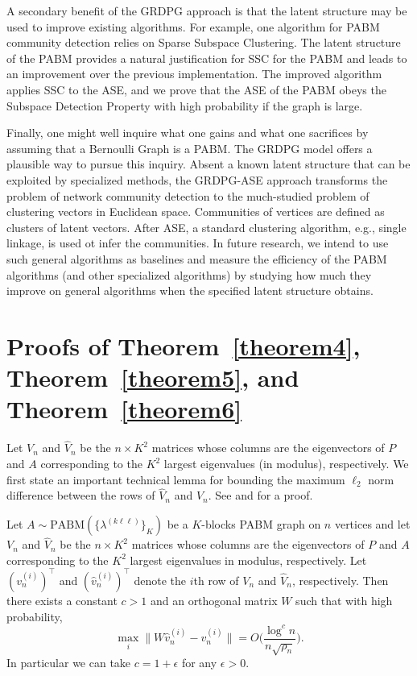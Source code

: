 \documentclass[12pt]{article}
\begin{document}
A secondary benefit of the GRDPG approach is that the latent structure
may be used to improve existing algorithms.  For example, one
algorithm for PABM community detection \citep{noroozi2019estimation}
relies on Sparse Subspace Clustering.  The latent structure of the
PABM provides a natural justification for SSC for the PABM and leads
to an improvement over the previous implementation.  The improved
algorithm applies SSC to the ASE, and we prove that the ASE of the
PABM obeys the Subspace Detection Property with high probability if
the graph is large.

Finally, one might well inquire what one gains and what one sacrifices
by assuming that a Bernoulli Graph is a PABM.  The GRDPG model offers
a plausible way to pursue this inquiry.  Absent a known latent
structure that can be exploited by specialized methods, the GRDPG-ASE
approach transforms the problem of network community detection to the
much-studied problem of clustering vectors in Euclidean space.
Communities of vertices are defined as clusters of latent vectors.
After ASE, a standard clustering algorithm, e.g., single linkage, is
used ot infer the communities.  In future research, we intend to use
such general algorithms as baselines and measure the efficiency of the
PABM algorithms (and other specialized algorithms) by studying how
much they improve on general algorithms when the specified latent
structure obtains.

\appendix
\renewcommand\refname{References}
% 
% 
\printbibliography

\hypertarget{proofs}{%
\section{Proofs of Theorem~\ref{theorem4}, Theorem~\ref{theorem5}, and Theorem~\ref{theorem6}}}
Let \(V_n\) and \(\hat{V}_n\)
be the $n \times K^2$ matrices whose columns are the eigenvectors of \(P\) and \(A\) corresponding to the
$K^2$ largest eigenvalues (in modulus), respectively. 
We first state an important technical lemma for bounding the maximum
$\ell_2$ norm difference between the rows of $\hat{V}_n$ and
$V_n$. See \citet{cape_biometrika} and 
\citet[Lemma~5]{rubindelanchy2017statistical} for a proof. 
\begin{lemma}
  \label{lem:technical}
Let $A \sim \mathrm{PABM}(\{\lambda^{(k \ell \ell)}\}_{K})$ be a $K$-blocks
PABM graph on $n$ vertices and let \(V_n\) and \(\hat{V}_n\)
be the $n \times K^2$ matrices whose columns are the eigenvectors of \(P\) and \(A\) corresponding to the
$K^2$ largest eigenvalues in modulus, respectively.
Let \((v_n^{(i)})^\top\) and \((\hat{v}_n^{(i)})^\top\) denote the $i$th 
row of \(V_n\) and \(\hat{V}_n\), respectively. 
Then there exists a constant $c > 1$ and an orthogonal matrix $W$ such
that with high probability,
$$\max_{i} \|W \hat{v}_n^{(i)} - v_n^{(i)}\|  = O\Big(\frac{\log^{c}n}{n \sqrt{\rho_n}} \Big).$$
In particular we can take $c = 1 + \epsilon$ for any $\epsilon > 0$. 
\end{lemma}
\end{document}
